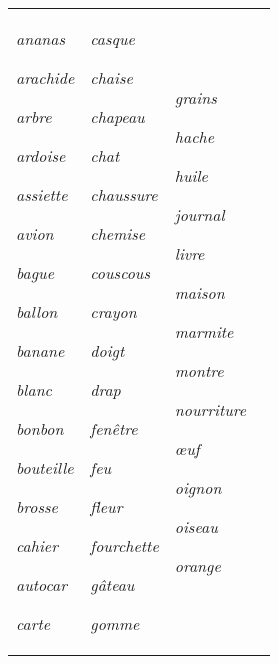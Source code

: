 \documentclass[output=paper,newtxmath,modfonts,nonflat,draftmode]{langsci/langscibook}
\begin{document}
\begin{tabularx}{\textwidth}{@{}XXXX@{}}
\textit{ananas}

\textit{arachide}

\textit{arbre~}

\textit{ardoise}

\textit{assiette} 

\textit{avion} 

\textit{bague}

\textit{ballon}

\textit{banane}

\textit{blanc} 

\textit{bonbon~}

\textit{bouteille}

\textit{brosse} 

\textit{cahier}

\textit{autocar}

\textit{carte} & \textit{casque} 

\textit{chaise}

\textit{chapeau}

\textit{chat}

\textit{chaussure}

\textit{chemise}

\textit{couscous}

\textit{crayon}

\textit{doigt}

\textit{drap} 

\textit{fenêtre} 

\textit{feu}

\textit{fleur} 

\textit{fourchette}

\textit{gâteau}

\textit{gomme} & \textit{grains} 

\textit{hache}

\textit{huile}

\textit{journal}

\textit{livre} 

\textit{maison}

\textit{marmite}

\textit{montre} 

\textit{nourriture}

\textit{œuf}

\textit{oignon}

\textit{oiseau}

\textit{orange}


\end{tabularx}
\end{document}

